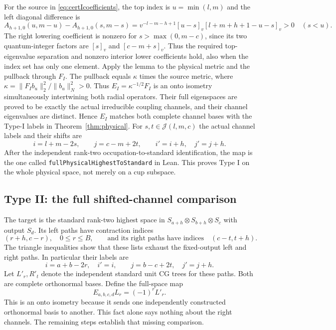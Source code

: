 \documentclass[10pt,a4paper]{article}
\newcommand{\lean}[1]{{\small\nolinkurl{#1}}}
\newenvironment{revision}{\begingroup}{\endgroup}
\begin{document}
\begin{revision}
For the source in \eqref{eq:certIcoefficients}, the top index is
$u=\min(l,m)$ and the left diagonal difference is
\[
 A_{h+1,0}(u,m-u)-A_{h+1,0}(s,m-s)
 =v^{-l-m-h+1}[u-s]_v[l+m+h+1-u-s]_v>0
 \quad(s<u).
\]
The right lowering coefficient is nonzero for
$s>\max(0,m-c)$, since its two quantum-integer factors are $[s]_v$
and $[c-m+s]_v$. Thus the required top-eigenvalue separation and
nonzero interior lower coefficients hold, also when the index set has
only one element. Apply the lemma to the physical
metric and the pullback through $F_I$. The pullback equals $\kappa$ times
the source metric, where $\kappa=\|F_I b_u\|_2^2/\|b_u\|_N^2>0$.
Thus $E_I=\kappa^{-1/2}F_I$ is an onto isometry simultaneously
intertwining both radial operators. Their full eigenspaces are proved to
be exactly the actual irreducible coupling channels, and their channel
eigenvalues are distinct. Hence $E_I$ matches both complete channel bases
with the Type-I labels in Theorem~\ref{thm:physical}.
For $s,t\in\mathcal J(l,m,c)$ the actual channel labels and their shifts are
\begin{equation}\label{eq:certIlabels}
 i=l+m-2s,\qquad j=c-m+2t,\qquad i'=i+h,\quad j'=j+h.
\end{equation}
After the independent rank-two occupation-to-standard identification, the
map is the one called \lean{fullPhysicalHighestToStandard} in Lean.
This proves Type I on the whole physical space, not merely on a cup subspace.

\subsection{Type II: the full shifted-channel comparison}
The target is the standard rank-two highest space in
$S_{a+h}\otimes S_{b+h}\otimes S_c$ with output $S_d$.
Its left paths have contraction indices
\begin{equation}\label{eq:certIIpaths}
 (r+h,c-r),\quad 0\le r\le B,
 \qquad\text{and its right paths have indices}\quad(c-t,t+h).
\end{equation}
The triangle inequalities show that these lists exhaust the fixed-output
left and right paths. In particular their labels are
\begin{equation}\label{eq:certIIlabels}
 i=a+b-2r,\quad i'=i,\qquad
 j=b-c+2t,\quad j'=j+h.
\end{equation}
Let $L'_r,R'_t$ denote the independent standard unit CG trees for these
paths. Both are complete orthonormal bases. Define the full-space map
\begin{equation}\label{eq:certIIE}
 E_{a,b,c,d}L_r=(-1)^rL'_r.
\end{equation}
This is an onto isometry because it sends one independently constructed
orthonormal basis to another. This fact alone says nothing about the
right channels. The remaining steps establish that missing comparison.


\end{revision}
\end{document}
